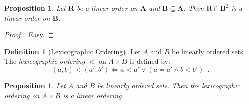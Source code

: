 \documentclass{book}
\let\qed\relax
\newtheorem{prop}[ax]{Proposition}
\theoremstyle{definition}
\newtheorem{df}[ax]{Definition}
\begin{document}
\begin{prop}
Let $\mathbf{R}$ be a linear order on $\mathbf{A}$ and $\mathbf{B} \subseteq \mathbf{A}$. Then $\mathbf{R} \cap \mathbf{B}^2$ is a linear order on $\mathbf{B}$.
\end{prop}

\begin{proof}
\pf\ Easy. \qed
\end{proof}

\begin{df}[Lexicographic Ordering]
Let $A$ and $B$ be linearly ordered sets. The \emph{lexicographic ordering} $<$ on $A \times B$ is defined by:
\[ (a,b) < (a',b') \Leftrightarrow a < a' \vee (a = a' \wedge b < b') \enspace . \]
\end{df}

\begin{prop}
Let $A$ and $B$ be linearly ordered sets. Then the lexicographic ordering on $A \times B$ is a linear ordering.
\end{prop}
\end{document}
